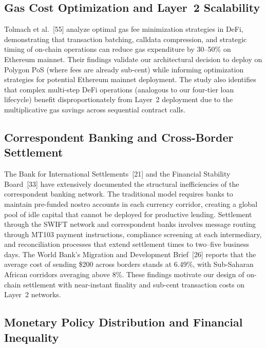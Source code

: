 \documentclass[12pt,a4paper]{report}
\begin{document}
\subsection{Gas Cost Optimization and Layer~2 Scalability}

Tolmach et al.~[55] analyze optimal gas fee minimization strategies in DeFi, demonstrating that transaction batching, calldata compression, and strategic timing of on-chain operations can reduce gas expenditure by 30--50\% on Ethereum mainnet. Their findings validate our architectural decision to deploy on Polygon PoS (where fees are already sub-cent) while informing optimization strategies for potential Ethereum mainnet deployment. The study also identifies that complex multi-step DeFi operations (analogous to our four-tier loan lifecycle) benefit disproportionately from Layer~2 deployment due to the multiplicative gas savings across sequential contract calls.

\subsection{Correspondent Banking and Cross-Border Settlement}

The Bank for International Settlements~[21] and the Financial Stability Board~[33] have extensively documented the structural inefficiencies of the correspondent banking network. The traditional model requires banks to maintain pre-funded nostro accounts in each currency corridor, creating a global pool of idle capital that cannot be deployed for productive lending. Settlement through the SWIFT network and correspondent banks involves message routing through MT103 payment instructions, compliance screening at each intermediary, and reconciliation processes that extend settlement times to two--five business days. The World Bank's Migration and Development Brief~[26] reports that the average cost of sending \$200 across borders stands at 6.49\%, with Sub-Saharan African corridors averaging above 8\%. These findings motivate our design of on-chain settlement with near-instant finality and sub-cent transaction costs on Layer~2 networks.

\subsection{Monetary Policy Distribution and Financial Inequality}
\end{document}
